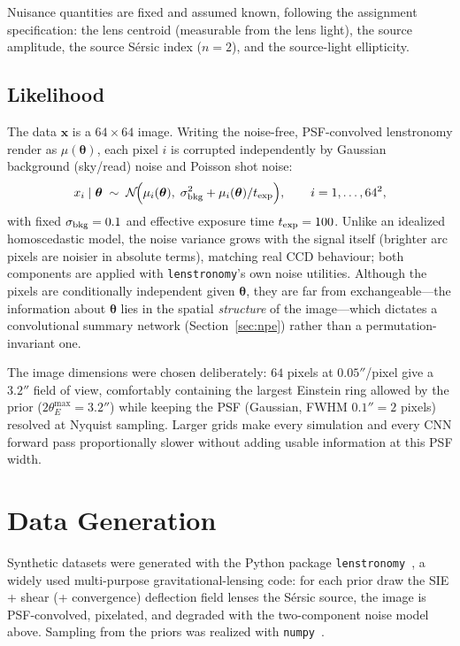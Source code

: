 \documentclass[11pt,a4paper]{article}
\begin{document}
Nuisance quantities are fixed and assumed known, following the assignment
specification: the lens centroid (measurable from the lens light), the source
amplitude, the source S\'ersic index ($n = 2$), and the source-light ellipticity.

\subsection{Likelihood}

The data $\mathbf{x}$ is a $64 \times 64$ image. Writing the noise-free,
PSF-convolved lenstronomy render as $\mu(\boldsymbol\theta)$, each pixel $i$ is
corrupted independently by Gaussian background (sky/read) noise and Poisson shot
noise:
\begin{equation}
x_i \mid \boldsymbol\theta \;\sim\;
\mathcal{N}\!\Big(\mu_i(\boldsymbol\theta),\;
\sigma_{\rm bkg}^2 + \mu_i(\boldsymbol\theta)/t_{\rm exp}\Big),
\qquad i = 1, \dots, 64^2,
\end{equation}
with fixed $\sigma_{\rm bkg} = 0.1$ and effective exposure time
$t_{\rm exp} = 100$. Unlike an idealized homoscedastic model, the noise variance
grows with the signal itself (brighter arc pixels are noisier in absolute terms),
matching real CCD behaviour; both components are applied with
\texttt{lenstronomy}'s own noise utilities. Although the pixels are conditionally
independent given $\boldsymbol\theta$, they are far from exchangeable---the
information about $\boldsymbol\theta$ lies in the spatial \emph{structure} of the
image---which dictates a convolutional summary network
(Section~\ref{sec:npe}) rather than a permutation-invariant one.

The image dimensions were chosen deliberately: $64$ pixels at $0.05''$/pixel give a
$3.2''$ field of view, comfortably containing the largest Einstein ring allowed by
the prior ($2\theta_E^{\max} = 3.2''$) while keeping the PSF
(Gaussian, FWHM $0.1'' = 2$ pixels) resolved at Nyquist sampling. Larger grids make
every simulation and every CNN forward pass proportionally slower without adding
usable information at this PSF width.

\section{Data Generation}

Synthetic datasets were generated with the Python package
\texttt{lenstronomy}~\cite{birrer2018lenstronomy}, a widely used multi-purpose
gravitational-lensing code: for each prior draw the SIE + shear (+ convergence)
deflection field lenses the S\'ersic source, the image is PSF-convolved, pixelated,
and degraded with the two-component noise model above. Sampling from the priors was
realized with \texttt{numpy}~\cite{harris2020numpy}.
\end{document}
